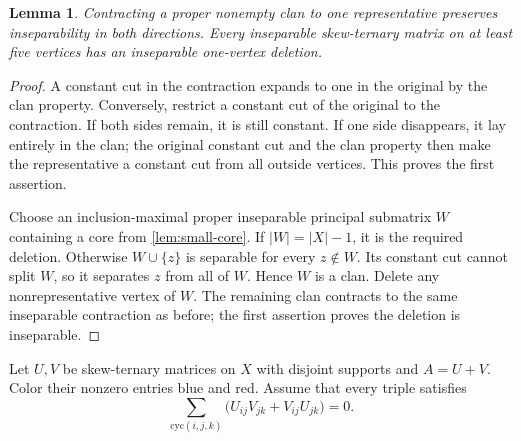 \documentclass[11pt,a4paper]{amsart}
\numberwithin{equation}{section}
\theoremstyle{plain}
\newtheorem{lemma}[theorem]{Lemma}
\theoremstyle{definition}
\begin{document}
\begin{lemma}\label{lem:deletion}
Contracting a proper nonempty clan to one representative preserves
inseparability in both directions.  Every inseparable skew-ternary matrix
on at least five vertices has an inseparable one-vertex deletion.
\end{lemma}
\begin{proof}
A constant cut in the contraction expands to one in the original by the
clan property.  Conversely, restrict a constant cut of the original to
the contraction.  If both sides remain, it is still constant.  If one side
disappears, it lay entirely in the clan; the original constant cut and
the clan property then make the representative a constant cut from all
outside vertices.  This proves the first assertion.

Choose an inclusion-maximal proper inseparable principal submatrix \(W\)
containing a core from \cref{lem:small-core}.  If \(|W|=|X|-1\), it is the
required deletion.  Otherwise \(W\cup\{z\}\) is separable for every
\(z\notin W\).  Its constant cut cannot split \(W\), so it separates \(z\)
from all of \(W\).  Hence \(W\) is a clan.  Delete any nonrepresentative vertex
of \(W\).  The remaining clan contracts to the same inseparable contraction
as before; the first assertion proves the deletion is inseparable.
\end{proof}

Let \(U,V\) be skew-ternary matrices on \(X\) with disjoint supports and \(A=U+V\).
Color their nonzero entries blue and red.  Assume that every triple satisfies
\begin{equation}\label{eq:matrix-triangle}
\sum_{\mathrm{cyc}(i,j,k)}
\bigl(U_{ij}V_{jk}+V_{ij}U_{jk}\bigr)=0.
\end{equation}
\end{document}
